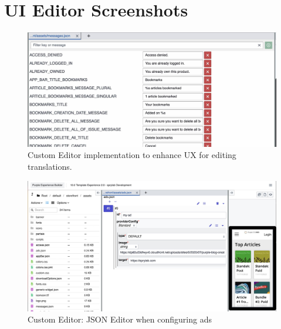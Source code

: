 \chapter{UI Editor Screenshots}
\label{app:screenshots}

\begin{figure}[h!]
  \includegraphics[width=\textwidth]{pics/messages_editor.jpg}
  \caption{Custom Editor implementation to enhance UX for editing translations.}
  \label{fig:messages_editor}
\end{figure}
\begin{figure}[h!]
  \includegraphics[width=\textwidth]{pics/ads_json_editor.jpg}
  \caption{Custom Editor: JSON Editor when configuring ads}
  \label{fig:ads-editor}
\end{figure}